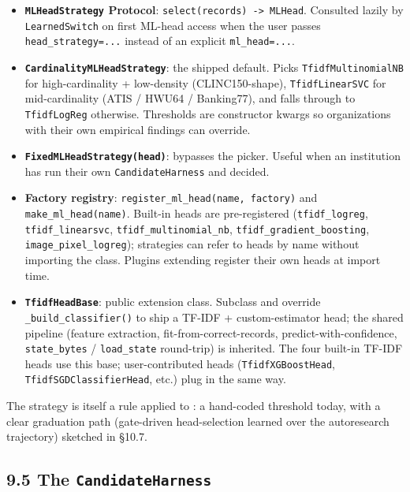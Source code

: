 \begin{itemize}
\tightlist
\item
  \textbf{\texttt{MLHeadStrategy} Protocol}:
  \texttt{select(records)\ -\textgreater{}\ MLHead}. Consulted lazily by
  \texttt{LearnedSwitch} on first ML-head access when the user passes
  \texttt{head\_strategy=...} instead of an explicit
  \texttt{ml\_head=...}.
\item
  \textbf{\texttt{CardinalityMLHeadStrategy}}: the shipped default.
  Picks \texttt{TfidfMultinomialNB} for high-cardinality + low-density
  (CLINC150-shape), \texttt{TfidfLinearSVC} for mid-cardinality (ATIS /
  HWU64 / Banking77), and falls through to \texttt{TfidfLogReg}
  otherwise. Thresholds are constructor kwargs so organizations with
  their own empirical findings can override.
\item
  \textbf{\texttt{FixedMLHeadStrategy(head)}}: bypasses the picker.
  Useful when an institution has run their own \texttt{CandidateHarness}
  and decided.
\item
  \textbf{Factory registry}: \texttt{register\_ml\_head(name,\ factory)}
  and \texttt{make\_ml\_head(name)}. Built-in heads are pre-registered
  (\texttt{tfidf\_logreg}, \texttt{tfidf\_linearsvc},
  \texttt{tfidf\_multinomial\_nb}, \texttt{tfidf\_gradient\_boosting},
  \texttt{image\_pixel\_logreg}); strategies can refer to heads by name
  without importing the class. Plugins extending \sysname{} register their
  own heads at import time.
\item
  \textbf{\texttt{TfidfHeadBase}}: public extension class. Subclass and
  override \texttt{\_build\_classifier()} to ship a TF-IDF +
  custom-estimator head; the shared pipeline (feature extraction,
  fit-from-correct-records, predict-with-confidence,
  \texttt{state\_bytes} / \texttt{load\_state} round-trip) is inherited.
  The four built-in TF-IDF heads use this base; user-contributed heads
  (\texttt{TfidfXGBoostHead}, \texttt{TfidfSGDClassifierHead}, etc.)
  plug in the same way.
\end{itemize}

The strategy is itself a \sysname{} rule applied to \sysname{}: a hand-coded
threshold today, with a clear graduation path (gate-driven
head-selection learned over the autoresearch trajectory) sketched in
§10.7.

\subsection{\texorpdfstring{9.5 The
\texttt{CandidateHarness}}{9.5 The CandidateHarness}}\label{the-candidateharness}

